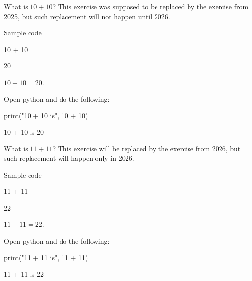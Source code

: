 \documentclass{book}
\begin{document}
\begin{exercise}[examdate={January 16, 2024}, examproblemnumber={1}, examproblemid={2024-01-16-01}, replacedbyexamproblemid={2023-01-16-01}, replacementsinceacademicyear={2026/2027}]
  What is \(10 + 10\)? This exercise was supposed to be replaced by the exercise from 2025, but such replacement will not happen until 2026.

Sample code
\begin{pycell}
10 + 10
\end{pycell}
\begin{pyexpectedoutput}
20
\end{pyexpectedoutput}
\end{exercise}

\begin{solution}
  \(10 + 10 = 20\).
\end{solution}

\begin{additionalinformation}
Open python and do the following:

\begin{pycell}
print("10 + 10 is", 10 + 10)
\end{pycell}
\begin{pyexpectedoutput}
10 + 10 is 20
\end{pyexpectedoutput}
\end{additionalinformation}

\begin{exercise}[examdate={January 16, 2025}, examproblemnumber={1}, examproblemid={2025-01-16-01}, replacedbyexamproblemid={2026-01-16-01}, replacementsinceacademicyear={2026/2027}]
  What is \(11 + 11\)? This exercise will be replaced by the exercise from 2026, but such replacement will happen only in 2026.

Sample code
\begin{pycell}
11 + 11
\end{pycell}
\begin{pyexpectedoutput}
22
\end{pyexpectedoutput}
\end{exercise}

\begin{solution}
  \(11 + 11 = 22\).
\end{solution}

\begin{additionalinformation}
Open python and do the following:

\begin{pycell}
print("11 + 11 is", 11 + 11)
\end{pycell}
\begin{pyexpectedoutput}
11 + 11 is 22
\end{pyexpectedoutput}
\end{additionalinformation}
\end{document}
